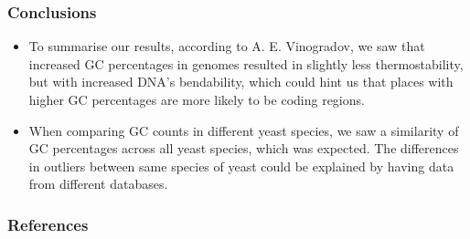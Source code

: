 \documentclass{beamer}
\begin{document}
\begin{frame}
  \frametitle{Conclusions}
  \begin{itemize}
      \item To summarise our results, according to A. E. Vinogradov, we saw that increased GC percentages in genomes resulted in slightly less thermostability, but with increased DNA's bendability, which could hint us that places with higher GC percentages are more likely to be coding regions.
      \item When comparing GC counts in different yeast species, we saw a similarity of GC percentages across all yeast species, which was expected. The differences in outliers between same species of yeast could be explained by having data from different databases.
  \end{itemize}
  
\end{frame}

\begin{frame}
\frametitle{References}
  
\end{frame}


  
\end{document}
